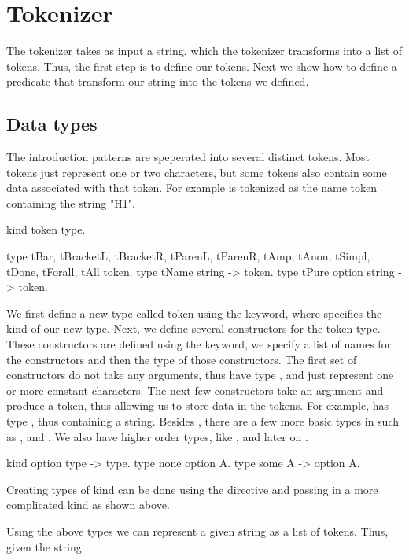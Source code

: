 \documentclass[thesis.tex]{subfiles}
\begin{document}
{\section{Tokenizer}\label{ssec:tokenizer}
The tokenizer takes as input a string, which the tokenizer transforms into a list of tokens. Thus, the first step is to define our tokens. Next we show how to define a predicate that transform our string into the tokens we defined.

\subsection{Data types}\label{sssec:datatypes}
The introduction patterns are speperated into several distinct tokens. Most tokens just represent one or two characters, but some tokens also contain some data associated with that token. For example  is tokenized as the name token containing the string "H1".
\begin{elpicode}
  kind token type.

  type tBar, tBracketL, tBracketR, tParenL, tParenR,
       tAmp, tAnon, tSimpl, tDone, tForall, tAll token.
  type tName string -> token.
  type tPure option string -> token.
\end{elpicode}
We first define a new type called token using the  keyword, where  specifies the kind of our new type. Next, we define several constructors for the token type. These constructors are defined using the  keyword, we specify a list of names for the constructors and then the type of those constructors. The first set of constructors do not take any arguments, thus have type , and just represent one or more constant characters. The next few constructors take an argument and produce a token, thus allowing us to store data in the tokens. For example,  has type , thus containing a string. Besides , there are a few more basic types in \elpi such as ,  and . We also have higher order types, like , and later on .
\begin{elpicode}
  kind option type -> type.
  type none option A.
  type some A -> option A.
\end{elpicode}
Creating types of kind  can be done using the  directive and passing in a more complicated kind as shown above.

Using the above types we can represent a given string as a list of tokens. Thus, given the string \elpii{"[H %
\begin{center}
  \elpii{[tBracketL, tName "H", tPure (some "H'"), tBracketR]}
\end{center}

}}
\end{document}
